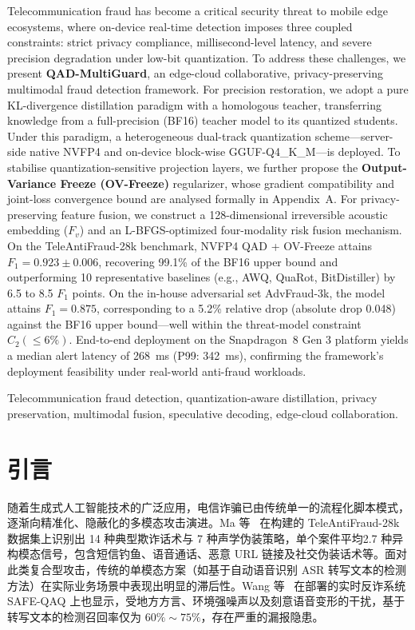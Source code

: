 \documentclass[11pt, a4paper]{article}
\begin{document}
\vspace{1em}
Telecommunication fraud has become a critical security threat to mobile edge ecosystems, where on-device real-time detection imposes three coupled constraints: strict privacy compliance, millisecond-level latency, and severe precision degradation under low-bit quantization. To address these challenges, we present \textbf{QAD-MultiGuard}, an edge-cloud collaborative, privacy-preserving multimodal fraud detection framework. For precision restoration, we adopt a pure KL-divergence distillation paradigm with a homologous teacher, transferring knowledge from a full-precision (BF16) teacher model to its quantized students. Under this paradigm, a heterogeneous dual-track quantization scheme---server-side native NVFP4 and on-device block-wise GGUF-Q4\_K\_M---is deployed. To stabilise quantization-sensitive projection layers, we further propose the \textbf{Output-Variance Freeze (OV-Freeze)} regularizer, whose gradient compatibility and joint-loss convergence bound are analysed formally in Appendix~A. For privacy-preserving feature fusion, we construct a 128-dimensional irreversible acoustic embedding ($F_v$) and an L-BFGS-optimized four-modality risk fusion mechanism. On the TeleAntiFraud-28k benchmark, NVFP4 QAD + OV-Freeze attains $F_1 = 0.923\pm0.006$, recovering 99.1\% of the BF16 upper bound and outperforming 10 representative baselines (e.g., AWQ, QuaRot, BitDistiller) by 6.5 to 8.5 $F_1$ points. On the in-house adversarial set AdvFraud-3k, the model attains $F_1 = 0.875$, corresponding to a 5.2\% relative drop (absolute drop 0.048) against the BF16 upper bound---well within the threat-model constraint $C_2(\le 6\%)$. End-to-end deployment on the Snapdragon~8 Gen 3 platform yields a median alert latency of 268~ms (P99: 342~ms), confirming the framework's deployment feasibility under real-world anti-fraud workloads.

Telecommunication fraud detection, quantization-aware distillation, privacy preservation, multimodal fusion, speculative decoding, edge-cloud collaboration.



\section{引言}
随着生成式人工智能技术的广泛应用，电信诈骗已由传统单一的流程化脚本模式，逐渐向精准化、隐蔽化的多模态攻击演进。Ma 等~\cite{1} 在构建的 TeleAntiFraud-28k 数据集上识别出 14 种典型欺诈话术与 7 种声学伪装策略，单个案件平均2.7 种异构模态信号，包含短信钓鱼、语音通话、恶意 URL 链接及社交伪装话术等。面对此类复合型攻击，传统的单模态方案（如基于自动语音识别 ASR 转写文本的检测方法）在实际业务场景中表现出明显的滞后性。Wang 等~\cite{2} 在部署的实时反诈系统 SAFE-QAQ 上也显示，受地方方言、环境强噪声以及刻意语音变形的干扰，基于转写文本的检测召回率仅为 $60\%\sim75\%$，存在严重的漏报隐患。
\end{document}
